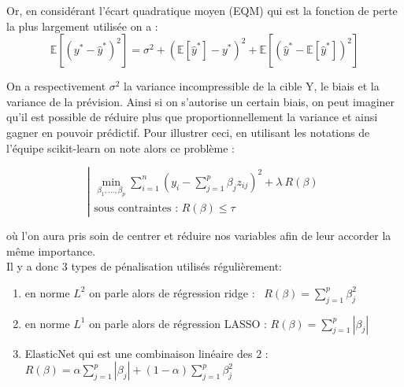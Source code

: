 \documentclass[french]{article}
\begin{document}
\begin{multicols}{2}
Or, en considérant l'écart quadratique moyen (EQM) qui est la fonction de perte la plus largement utilisée on a : 
\[\mathbb{E}\left[\left(y^{*}-\hat{y}^{*}\right)^{2}\right]=\sigma^{2}+\left(\mathbb{E}\left[\hat{y}^{*}\right]-y^{*}\right)^{2}+\mathbb{E}\left[\left(\hat{y}^{*}-\mathbb{E}\left[\hat{y}^{*}\right]\right)^{2}\right] \]

On a respectivement $\sigma^{2}$ la variance incompressible de la cible Y, le biais et la variance de la prévision. Ainsi si on s'autorise un certain biais, on peut imaginer qu'il est possible de réduire plus que proportionnellement la variance et ainsi gagner en pouvoir prédictif. Pour illustrer ceci, en utilisant les notations de l'équipe scikit-learn on note alors ce problème : 

\[ \left| \begin{array}{l}\displaystyle\min_{\beta_1, \dots, \beta_p} \sum_{i=1}^{n} \left( y_i - \sum_{j=1}^{p}\beta_j z_{ij} \right)^2 + \lambda \ R(\beta) \\
\text{sous contraintes : } R (\beta) \leq \tau \end{array} \right.\]


où l'on aura pris soin de centrer et réduire nos variables afin de leur accorder la même importance.
\\

Il y a donc 3 types de pénalisation utilisés régulièrement: 
\begin{enumerate}
    \item en norme $L^{2}$ on parle alors de régression ridge  : \ $R(\beta)=\sum_{j=1}^{p}\beta_{j}^{2}$
    \item en norme $L^{1}$ on parle alors de régression LASSO  : $R(\beta)=\sum_{j=1}^{p}\left|\beta_{j}\right|$
    \item ElasticNet qui est une combinaison linéaire des 2 : $R(\beta)=\alpha \sum_{j=1}^{p}\left|\beta_{j}\right|+(1-\alpha) \sum_{j=1}^{p} \beta_{j}^{2}$
\end{enumerate}


\end{multicols}
\end{document}
